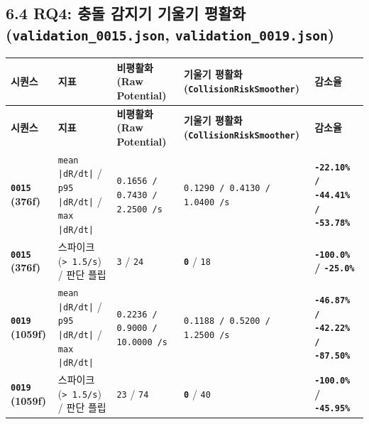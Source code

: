 \documentclass[10.5pt,a4paper]{article}
\begin{document}
\subsection{6.4 RQ4: 충돌 감지기 기울기 평활화 (\texttt{validation\_\allowbreak{}0015.\allowbreak{}json}, \texttt{validation\_\allowbreak{}0019.\allowbreak{}json})}

\begin{footnotesize}
\setlength{\tabcolsep}{4pt}
\setlength{\LTleft}{0pt}\setlength{\LTright}{0pt}
\begin{longtable}{>{\raggedright\arraybackslash}p{} >{\raggedright\arraybackslash}p{} >{\raggedright\arraybackslash}p{} >{\raggedright\arraybackslash}p{} >{\raggedright\arraybackslash}p{}}
\toprule
\textbf{시퀀스} & \textbf{지표} & \textbf{비평활화 (Raw Potential)} & \textbf{기울기 평활화 (\texttt{CollisionRiskSmoother})} & \textbf{감소율} \\
\midrule
\endfirsthead
\toprule
\textbf{시퀀스} & \textbf{지표} & \textbf{비평활화 (Raw Potential)} & \textbf{기울기 평활화 (\texttt{CollisionRiskSmoother})} & \textbf{감소율} \\
\midrule
\endhead
\bottomrule
\endfoot
\textbf{\texttt{0015} (376f)} & \texttt{mean |dR/\allowbreak{}dt|} / \texttt{p95 |dR/\allowbreak{}dt|} / \texttt{max |dR/\allowbreak{}dt|} & \texttt{0.\allowbreak{}1656 /\allowbreak{} 0.\allowbreak{}7430 /\allowbreak{} 2.\allowbreak{}2500 /\allowbreak{}s} & \texttt{0.\allowbreak{}1290 /\allowbreak{} 0.\allowbreak{}4130 /\allowbreak{} 1.\allowbreak{}0400 /\allowbreak{}s} & \textbf{\texttt{-\allowbreak{}22.\allowbreak{}10\% /\allowbreak{} -\allowbreak{}44.\allowbreak{}41\% /\allowbreak{} -\allowbreak{}53.\allowbreak{}78\%}} \\
\textbf{\texttt{0015} (376f)} & 스파이크 (\texttt{> 1.\allowbreak{}5/\allowbreak{}s}) / 판단 플립 & \texttt{3} / \texttt{24} & \textbf{\texttt{0}} / \texttt{18} & \textbf{\texttt{-\allowbreak{}100.\allowbreak{}0\%} / \texttt{-\allowbreak{}25.\allowbreak{}0\%}} \\
\textbf{\texttt{0019} (1059f)} & \texttt{mean |dR/\allowbreak{}dt|} / \texttt{p95 |dR/\allowbreak{}dt|} / \texttt{max |dR/\allowbreak{}dt|} & \texttt{0.\allowbreak{}2236 /\allowbreak{} 0.\allowbreak{}9000 /\allowbreak{} 10.\allowbreak{}0000 /\allowbreak{}s} & \texttt{0.\allowbreak{}1188 /\allowbreak{} 0.\allowbreak{}5200 /\allowbreak{} 1.\allowbreak{}2500 /\allowbreak{}s} & \textbf{\texttt{-\allowbreak{}46.\allowbreak{}87\% /\allowbreak{} -\allowbreak{}42.\allowbreak{}22\% /\allowbreak{} -\allowbreak{}87.\allowbreak{}50\%}} \\
\textbf{\texttt{0019} (1059f)} & 스파이크 (\texttt{> 1.\allowbreak{}5/\allowbreak{}s}) / 판단 플립 & \texttt{23} / \texttt{74} & \textbf{\texttt{0}} / \texttt{40} & \textbf{\texttt{-\allowbreak{}100.\allowbreak{}0\%} / \texttt{-\allowbreak{}45.\allowbreak{}95\%}} \\
\end{longtable}
\end{footnotesize}
\end{document}
